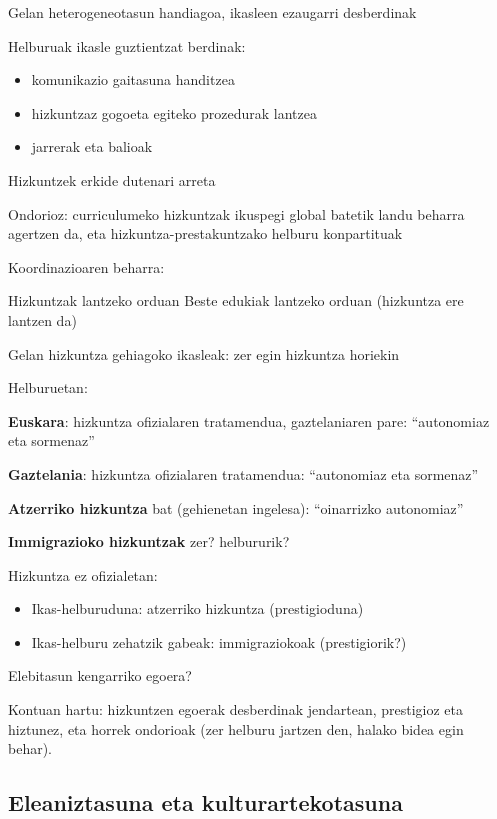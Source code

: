 \documentclass[
]{book}
\providecommand{\tightlist}{%
  \setlength{\itemsep}{0pt}\setlength{\parskip}{0pt}}
\begin{document}
Gelan heterogeneotasun handiagoa, ikasleen ezaugarri desberdinak

Helburuak ikasle guztientzat berdinak:

\begin{itemize}
\tightlist
\item
  komunikazio gaitasuna handitzea
\item
  hizkuntzaz gogoeta egiteko prozedurak lantzea
\item
  jarrerak eta balioak
\end{itemize}

Hizkuntzek erkide dutenari arreta

Ondorioz: curriculumeko hizkuntzak ikuspegi global batetik landu beharra agertzen da, eta hizkuntza-prestakuntzako helburu konpartituak

Koordinazioaren beharra:

Hizkuntzak lantzeko orduan
Beste edukiak lantzeko orduan (hizkuntza ere lantzen da)

Gelan hizkuntza gehiagoko ikasleak: zer egin hizkuntza horiekin

Helburuetan:

\textbf{Euskara}: hizkuntza ofizialaren tratamendua, gaztelaniaren pare: ``autonomiaz eta sormenaz''

\textbf{Gaztelania}: hizkuntza ofizialaren tratamendua: ``autonomiaz eta sormenaz''

\textbf{Atzerriko hizkuntza} bat (gehienetan ingelesa): ``oinarrizko autonomiaz''

\textbf{Immigrazioko hizkuntzak} zer? helbururik?

Hizkuntza ez ofizialetan:

\begin{itemize}
\tightlist
\item
  Ikas-helburuduna: atzerriko hizkuntza (prestigioduna)
\item
  Ikas-helburu zehatzik gabeak: immigraziokoak (prestigiorik?)
\end{itemize}

Elebitasun kengarriko egoera?

Kontuan hartu: hizkuntzen egoerak desberdinak jendartean, prestigioz eta hiztunez, eta horrek ondorioak (zer helburu jartzen den, halako bidea egin behar).

\hypertarget{eleaniztasuna-eta-kulturartekotasuna}{%
\subsection{Eleaniztasuna eta kulturartekotasuna}\label{eleaniztasuna-eta-kulturartekotasuna}}
\end{document}
